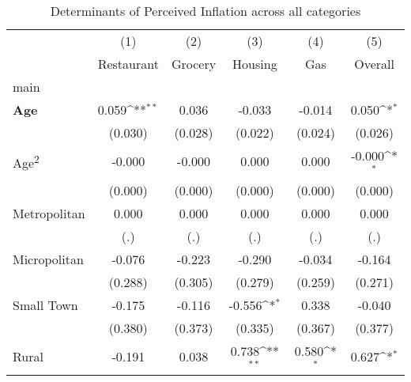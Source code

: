 \begin{table}[htbp]\centering
\def\sym#1{\ifmmode^{#1}\else\(^{#1}\)\fi}
\caption{Determinants of Perceived Inflation across all categories}
\begin{tabular}{l*{5}{c}}
\hline\hline
                    &\multicolumn{1}{c}{(1)}&\multicolumn{1}{c}{(2)}&\multicolumn{1}{c}{(3)}&\multicolumn{1}{c}{(4)}&\multicolumn{1}{c}{(5)}\\
                    &\multicolumn{1}{c}{Restaurant}&\multicolumn{1}{c}{Grocery}&\multicolumn{1}{c}{Housing}&\multicolumn{1}{c}{Gas}&\multicolumn{1}{c}{Overall}\\
\hline
main                &                     &                     &                     &                     &                     \\
\textbf{Age}        &       0.059\sym{**} &       0.036         &      -0.033         &      -0.014         &       0.050\sym{*}  \\
                    &     (0.030)         &     (0.028)         &     (0.022)         &     (0.024)         &     (0.026)         \\
Age\textsuperscript{2}&      -0.000         &      -0.000         &       0.000         &       0.000         &      -0.000\sym{*}  \\
                    &     (0.000)         &     (0.000)         &     (0.000)         &     (0.000)         &     (0.000)         \\
Metropolitan        &       0.000         &       0.000         &       0.000         &       0.000         &       0.000         \\
                    &         (.)         &         (.)         &         (.)         &         (.)         &         (.)         \\
Micropolitan        &      -0.076         &      -0.223         &      -0.290         &      -0.034         &      -0.164         \\
                    &     (0.288)         &     (0.305)         &     (0.279)         &     (0.259)         &     (0.271)         \\
Small Town          &      -0.175         &      -0.116         &      -0.556\sym{*}  &       0.338         &      -0.040         \\
                    &     (0.380)         &     (0.373)         &     (0.335)         &     (0.367)         &     (0.377)         \\
Rural               &      -0.191         &       0.038         &       0.738\sym{**} &       0.580\sym{*}  &       0.627\sym{*}  \\

\end{tabular}
\end{table}
